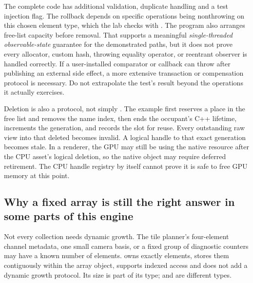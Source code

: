 The complete code has additional validation, duplicate handling and a test injection flag. The rollback depends on specific operations being nonthrowing on this chosen element type, which the lab checks with . The program also arranges free-list capacity before removal. That supports a meaningful \emph{single-threaded observable-state} guarantee for the demonstrated paths, but it does not prove every allocator, custom hash, throwing equality operator, or reentrant observer is handled correctly. If a user-installed comparator or callback can throw after publishing an external side effect, a more extensive transaction or compensation protocol is necessary. Do not extrapolate the test's result beyond the operations it actually exercises.

Deletion is also a protocol, not simply . The example first reserves a place in the free list and removes the name index, then ends the occupant's C++ lifetime, increments the generation, and records the slot for reuse. Every outstanding raw view into that deleted  becomes invalid. A logical handle to that exact generation becomes stale. In a renderer, the GPU may still be using the native resource after the CPU asset's logical deletion, so the native object may require deferred retirement. The CPU handle registry by itself cannot prove it is safe to free GPU memory at this point.

\subsection{Why a fixed array is still the right answer in some parts of this engine}\label{01-foundations-i-ch006-why-a-fixed-array-is-still-the-right-answer-in-some-parts-of-this-engine}

\hypertarget{01-foundations-i-ch006-why-a-fixed-array-is-still-the-right-answer-in-some-parts-of-this-engine}{}

Not every collection needs dynamic growth. The tile planner's four-element channel metadata, one small camera basis, or a fixed group of diagnostic counters may have a known number of elements.  owns exactly  elements, stores them contiguously within the array object, supports indexed access and does not add a dynamic growth protocol. Its size is part of its type;  and  are different types.

